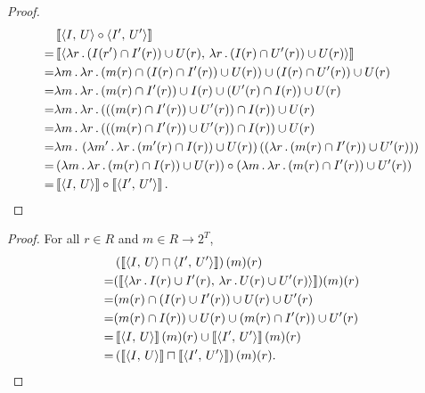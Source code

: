 \equalComp*
{}
\begin{proof}
\begin{align*}
  &\left\llbracket\left\langle I,\,U\right\rangle\circ\left\langle I',\,U'\right\rangle\right\rrbracket\\
  =&\left\llbracket\left\langle \lambda r\,.\,(I(r')\cap I'(r))\cup U(r),\,\lambda r\,.\,(I(r)\cap U'(r))\cup U(r)\right\rangle\right\rrbracket\\
  =&\lambda m\,.\,\lambda r\,.\,(m(r)\cap(I(r)\cap I'(r))\cup U(r))\cup(I(r)\cap U'(r))\cup U(r)\\
  =&\lambda m\,.\,\lambda r\,.\,(m(r)\cap I'(r))\cup I(r)\cup (U'(r)\cap I(r))\cup U(r)\\
  =&\lambda m\,.\,\lambda r\,.\,(((m(r)\cap I'(r))\cup U'(r))\cap I(r))\cup U(r)\\
  =&\lambda m\,.\,\lambda r\,.\,(((m(r)\cap I'(r))\cup U'(r))\cap I(r))\cup U(r)\\
  =&\lambda m\,.\,\left(\lambda m'\,.\,\lambda r\,.\,(m'(r)\cap I(r))\cup U(r)\right)
    \left(
    \left(\lambda r\,.\,(m(r)\cap I'(r))\cup U'(r)\right)
    \right)\\
  =&\left(\lambda m\,.\,\lambda r\,.\,(m(r)\cap I(r))\cup U(r)\right)\circ
    \left(\lambda m\,.\,\lambda r\,.\,(m(r)\cap I'(r))\cup U'(r)\right)\\
  =&\left\llbracket\left\langle I,\,U\right\rangle\right\rrbracket\circ\left\llbracket\left\langle I',\,U'\right\rangle\right\rrbracket.\qedhere
\end{align*}
\end{proof}

\equalMeet*
\begin{proof}
  For all $r\in R$ and $m\in R\to2^T$,
\begin{align*}
  &\left(\left\llbracket\left\langle I,\,U\right\rangle \sqcap \left\langle I',\,U'\right\rangle\right\rrbracket\right)(m)(r)\\
  =&(\left\llbracket\left\langle \lambda r\,.\,I(r) \cup I'(r),\,\lambda r\,.\,U(r) \cup U'(r)\right\rangle\right\rrbracket)(m)(r)\\
  =&(m(r)\cap(I(r)\cup I'(r))\cup U(r)\cup U'(r)\\
  =&(m(r)\cap I(r))\cup U(r)\cup(m(r)\cap I'(r))\cup U'(r)\\
  =&\left\llbracket\left\langle I,\,U\right\rangle\right\rrbracket(m)(r)\cup\left\llbracket\left\langle I',\,U'\right\rangle\right\rrbracket(m)(r)\\
  =&\left(\left\llbracket\left\langle I,\,U\right\rangle\right\rrbracket \sqcap \left\llbracket\left\langle I',\,U'\right\rangle\right\rrbracket\right)(m)(r).\qedhere
\end{align*}
\end{proof}

